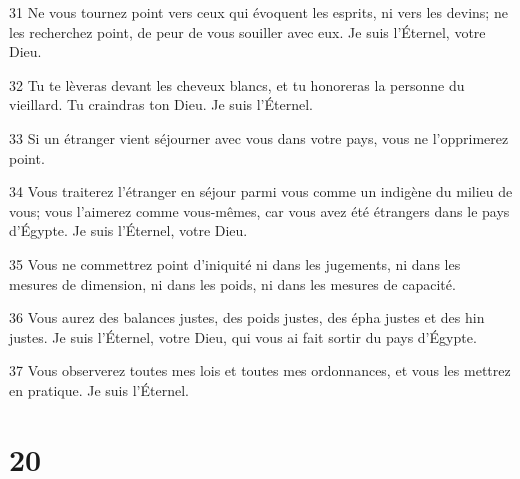 \par 31 Ne vous tournez point vers ceux qui évoquent les esprits, ni vers les devins; ne les recherchez point, de peur de vous souiller avec eux. Je suis l'Éternel, votre Dieu.
\par 32 Tu te lèveras devant les cheveux blancs, et tu honoreras la personne du vieillard. Tu craindras ton Dieu. Je suis l'Éternel.
\par 33 Si un étranger vient séjourner avec vous dans votre pays, vous ne l'opprimerez point.
\par 34 Vous traiterez l'étranger en séjour parmi vous comme un indigène du milieu de vous; vous l'aimerez comme vous-mêmes, car vous avez été étrangers dans le pays d'Égypte. Je suis l'Éternel, votre Dieu.
\par 35 Vous ne commettrez point d'iniquité ni dans les jugements, ni dans les mesures de dimension, ni dans les poids, ni dans les mesures de capacité.
\par 36 Vous aurez des balances justes, des poids justes, des épha justes et des hin justes. Je suis l'Éternel, votre Dieu, qui vous ai fait sortir du pays d'Égypte.
\par 37 Vous observerez toutes mes lois et toutes mes ordonnances, et vous les mettrez en pratique. Je suis l'Éternel.

\chapter{20}

